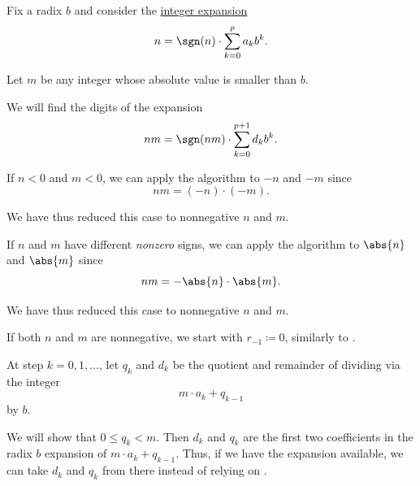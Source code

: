 \begin{algorithm}\label{alg:single_digit_multiplication_with_carrying}
  Fix a radix \( b \) and consider the \hyperref[def:integer_radix_expansion]{integer expansion}
  \begin{equation*}
    n = \sgn(n) \cdot \sum_{k=0}^p a_k b^k.
  \end{equation*}

  Let \( m \) be any integer whose absolute value is smaller than \( b \).

  We will find the digits of the expansion
  \begin{equation*}
    nm = \sgn(nm) \cdot \sum_{k=0}^{p + 1} d_k b^k.
  \end{equation*}

  \begin{thmenum}
     If \( n < 0 \) and \( m < 0 \), we can apply the algorithm to \( -n \) and \( -m \) since
    \begin{equation*}
      nm = (-n) \cdot (-m).
    \end{equation*}

    We have thus reduced this case to nonnegative \( n \) and \( m \).

     If \( n \) and \( m \) have different \emph{nonzero} signs, we can apply the algorithm to \( \abs{n} \) and \( \abs{m} \) since
    \begin{equation*}
      nm = -\abs{n} \cdot \abs{m}.
    \end{equation*}

    We have thus reduced this case to nonnegative \( n \) and \( m \).

     If both \( n \) and \( m \) are nonnegative, we start with \( r_{-1} \coloneqq 0 \), similarly to .

     At step \( k = 0, 1, \ldots \), let \( q_k \) and \( d_k \) be the quotient and remainder of dividing via  the integer
    \begin{equation}\label{eq:alg:single_digit_multiplication_with_carrying/step/quot}
      m \cdot a_k + q_{k - 1}
    \end{equation}
    by \( b \).

    We will show that \( 0 \leq q_k < m \). Then \( d_k \) and \( q_k \) are the first two coefficients in the radix \( b \) expansion of \( m \cdot a_k + q_{k-1} \). Thus, if we have the expansion available, we can take \( d_k \) and \( q_k \) from there instead of relying on .
  \end{thmenum}
\end{algorithm}
